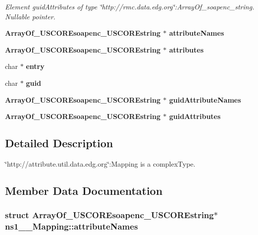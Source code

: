 \begin{CompactItemize}
\begin{CompactList}\small\item\em Element guid\-Attributes of type \char`\"{}http://rmc.data.edg.org\char`\"{}:Array\-Of\_\-soapenc\_\-string. Nullable pointer. \item\end{CompactList}\item 
\bf{Array\-Of\_\-USCOREsoapenc\_\-USCOREstring} $\ast$ \textbf{attribute\-Names}\label{structns1____Mapping_1e9799ca189f20b337768ee4233948ee}

\item 
\bf{Array\-Of\_\-USCOREsoapenc\_\-USCOREstring} $\ast$ \textbf{attributes}\label{structns1____Mapping_8095d927d5e70c759cf8c7a7e7df9623}

\item 
char $\ast$ \textbf{entry}\label{structns1____Mapping_aa1a2dbb201e59a114d0488a64c01862}

\item 
char $\ast$ \textbf{guid}\label{structns1____Mapping_84fc211e929bcde53718bc8e8b4b3686}

\item 
\bf{Array\-Of\_\-USCOREsoapenc\_\-USCOREstring} $\ast$ \textbf{guid\-Attribute\-Names}\label{structns1____Mapping_c53c70829394dd85f68cff7c4f111b42}

\item 
\bf{Array\-Of\_\-USCOREsoapenc\_\-USCOREstring} $\ast$ \textbf{guid\-Attributes}\label{structns1____Mapping_6d621ef8882153203d71881540f88177}

\end{CompactItemize}


\subsection{Detailed Description}
\char`\"{}http://attribute.util.data.edg.org\char`\"{}:Mapping is a complex\-Type. 



\subsection{Member Data Documentation}
\subsubsection{\setlength{\rightskip}{0pt plus 5cm}struct \bf{Array\-Of\_\-USCOREsoapenc\_\-USCOREstring}$\ast$ \bf{ns1\_\-\_\-Mapping::attribute\-Names}}\label{structns1____Mapping_1e9799ca189f20b337768ee4233948ee}


